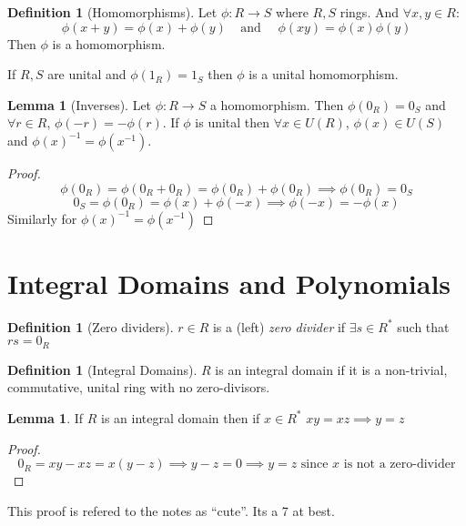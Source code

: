 \documentclass[11pt,a4paper]{article}
\theoremstyle{definition}
\newtheorem{definition}[theorem]{Definition}
\newtheorem{lemma}[theorem]{Lemma}
\begin{document}
\begin{definition}[Homomorphisms]
Let $\phi: R \longrightarrow S$ where $R, S$ rings. And $\forall x, y \in R$:
\[
	\phi(x + y) = \phi(x) + \phi(y) \ \ \ \ \ \text{and} \ \ \ \ \ \  \phi(xy) = \phi(x) \phi(y)
\]
Then $\phi$ is a homomorphism.

If $R, S$ are unital and $\phi(1_R) = 1_S$ then $\phi$ is a unital homomorphism.
\end{definition}

\begin{lemma}[Inverses]
Let $\phi: R \longrightarrow S$ a homomorphism. Then $\phi(0_R) = 0_S$ and $\forall r \in R$,  $\phi(-r) = -\phi(r)$. If $\phi$ is unital then $\forall x \in U(R)$, $\phi(x) \in U(S)$ and $\phi(x)^{-1} = \phi(x^{-1})$.
\end{lemma}

\begin{proof}
\[
	\phi(0_R) = \phi(0_R + 0_R) = \phi(0_R) + \phi(0_R) \implies \phi(0_R) = 0_S
\]
\[
	0_S = \phi(0_R) = \phi(x) + \phi(-x) \implies \phi(-x) = -\phi(x) 
\]
Similarly for $\phi(x)^{-1} = \phi(x^{-1})$
\end{proof}

\section{Integral Domains and Polynomials}

\begin{definition}[Zero dividers]
$r \in R$ is a (left) \emph{zero divider} if $\exists s \in R^*$ such that $rs = 0_R$
\end{definition}

\begin{definition}[Integral Domains]
$R$ is an integral domain if it is a non-trivial, commutative, unital ring with no zero-divisors.
\end{definition}

\begin{lemma}
	If $R$ is an integral domain then if $x\in R^*$ $xy=xz \implies y = z$
\end{lemma}

\begin{proof}
\[
	0_R = xy - xz = x(y-z) \implies y-z = 0\implies y = z \text{ since } x \text{ is not a zero-divider}
\]
\end{proof}

This proof is refered to the notes as ``cute''. Its a 7 at best.
\end{document}

